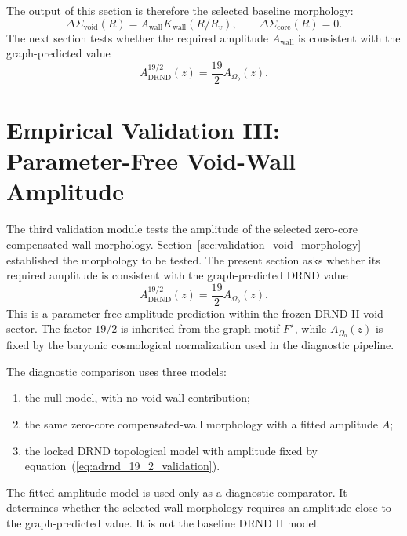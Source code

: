 \documentclass[12pt]{iopart}
\begin{document}
The output of this section is therefore the selected baseline morphology:
\begin{equation}
\Delta\Sigma_{\mathrm{void}}(R)
=
A_{\mathrm{wall}}K_{\mathrm{wall}}(R/R_v),
\qquad
\Delta\Sigma_{\mathrm{core}}(R)=0.
\end{equation}
The next section tests whether the required amplitude \(A_{\mathrm{wall}}\) is consistent with the graph-predicted value
\begin{equation}
A_{\mathrm{DRND}}^{19/2}(z)
=
\frac{19}{2}A_{\Omega_b}(z).
\end{equation}

\section{Empirical Validation III: Parameter-Free Void-Wall Amplitude}
\label{sec:validation_void_amplitude}

The third validation module tests the amplitude of the selected zero-core compensated-wall morphology. Section~\ref{sec:validation_void_morphology} established the morphology to be tested. The present section asks whether its required amplitude is consistent with the graph-predicted DRND value
\begin{equation}
A_{\mathrm{DRND}}^{19/2}(z)
=
\frac{19}{2}A_{\Omega_b}(z).
\label{eq:adrnd_19_2_validation}
\end{equation}
This is a parameter-free amplitude prediction within the frozen DRND II void sector. The factor \(19/2\) is inherited from the graph motif \(F^\star\), while \(A_{\Omega_b}(z)\) is fixed by the baryonic cosmological normalization used in the diagnostic pipeline.

The diagnostic comparison uses three models:
\begin{enumerate}
    \item the null model, with no void-wall contribution;
    \item the same zero-core compensated-wall morphology with a fitted amplitude \(A\);
    \item the locked DRND topological model with amplitude fixed by equation~(\ref{eq:adrnd_19_2_validation}).
\end{enumerate}
The fitted-amplitude model is used only as a diagnostic comparator. It determines whether the selected wall morphology requires an amplitude close to the graph-predicted value. It is not the baseline DRND II model.
\end{document}
